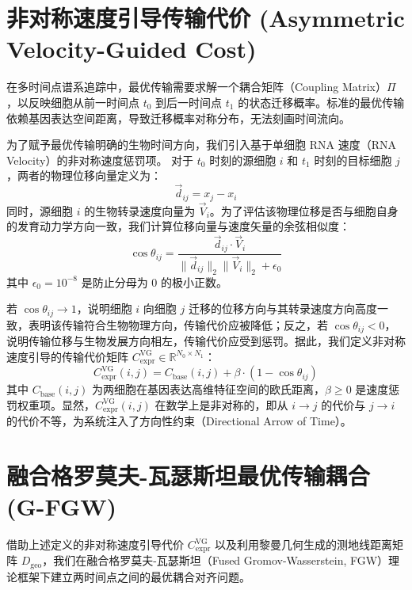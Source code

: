 \section{非对称速度引导传输代价 (Asymmetric Velocity-Guided Cost)}
在多时间点谱系追踪中，最优传输需要求解一个耦合矩阵（Coupling Matrix）$\Pi$，以反映细胞从前一时间点 $t_0$ 到后一时间点 $t_1$ 的状态迁移概率。标准的最优传输依赖基因表达空间距离，导致迁移概率对称分布，无法刻画时间流向。

为了赋予最优传输明确的生物时间方向，我们引入基于单细胞 RNA 速度（RNA Velocity）的非对称速度惩罚项。
对于 $t_0$ 时刻的源细胞 $i$ 和 $t_1$ 时刻的目标细胞 $j$，两者的物理位移向量定义为：
\begin{equation}
    \vec{d}_{ij} = x_j - x_i
\end{equation}
同时，源细胞 $i$ 的生物转录速度向量为 $\vec{V}_i$。为了评估该物理位移是否与细胞自身的发育动力学方向一致，我们计算位移向量与速度矢量的余弦相似度：
\begin{equation}
    \cos\theta_{ij} = \frac{\vec{d}_{ij} \cdot \vec{V}_i}{\|\vec{d}_{ij}\|_2 \|\vec{V}_i\|_2 + \epsilon_0}
\end{equation}
其中 $\epsilon_0 = 10^{-8}$ 是防止分母为 0 的极小正数。

若 $\cos\theta_{ij} \to 1$，说明细胞 $i$ 向细胞 $j$ 迁移的位移方向与其转录速度方向高度一致，表明该传输符合生物物理方向，传输代价应被降低；反之，若 $\cos\theta_{ij} < 0$，说明传输位移与生物发展方向相左，传输代价应受到惩罚。据此，我们定义非对称速度引导的传输代价矩阵 $C_{\text{expr}}^{\text{VG}} \in \mathbb{R}^{N_0 \times N_1}$：
\begin{equation}
    C_{\text{expr}}^{\text{VG}}(i, j) = C_{\text{base}}(i, j) + \beta \cdot (1 - \cos\theta_{ij})
\end{equation}
其中 $C_{\text{base}}(i, j)$ 为两细胞在基因表达高维特征空间的欧氏距离，$\beta \ge 0$ 是速度惩罚权重项。显然，$C_{\text{expr}}^{\text{VG}}(i, j)$ 在数学上是非对称的，即从 $i \to j$ 的代价与 $j \to i$ 的代价不等，为系统注入了方向性约束（Directional Arrow of Time）。

\section{融合格罗莫夫-瓦瑟斯坦最优传输耦合 (G-FGW)}
借助上述定义的非对称速度引导代价 $C_{\text{expr}}^{\text{VG}}$ 以及利用黎曼几何生成的测地线距离矩阵 $D_{\text{geo}}$，我们在融合格罗莫夫-瓦瑟斯坦（Fused Gromov-Wasserstein, FGW）理论框架下建立两时间点之间的最优耦合对齐问题\cite{Vayer2020}。

